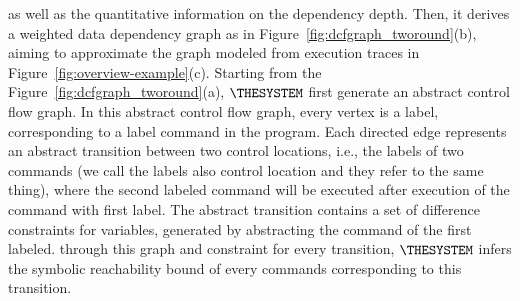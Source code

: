 %
 as well as the quantitative information on the dependency depth. Then, it derives a weighted data dependency graph as in Figure~\ref{fig:dcfgraph_tworound}(b), aiming to approximate the graph modeled from execution traces in Figure~\ref{fig:overview-example}(c).
 Starting from the Figure~\ref{fig:dcfgraph_tworound}(a), $\THESYSTEM$ first generate an abstract control flow graph.
   In this abstract control flow graph, every vertex is a label,
 corresponding to a label command in the program.
Each directed 
 edge represents an abstract transition 
 between two control locations, i.e., the labels of two commands (we call the labels also control location and they refer to the same thing), 
 where the second labeled command will be executed after execution of the command with first label.
 The abstract transition contains a set of difference constraints for variables, generated by abstracting the command of the first labeled.
 through this graph and constraint for every transition, 
 $\THESYSTEM$ infers the  symbolic reachability bound of every commands corresponding to 
this transition.
